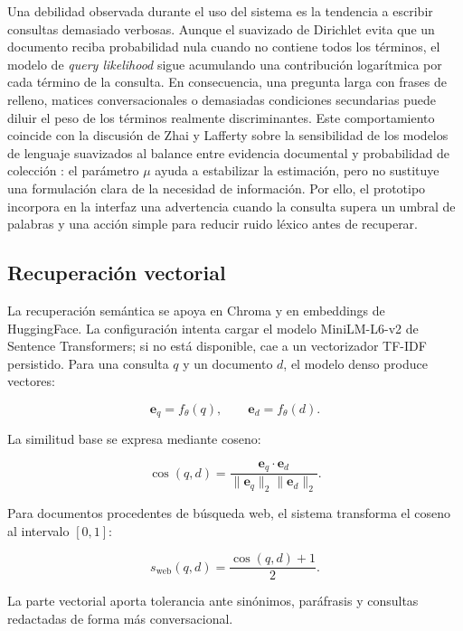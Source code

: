 \documentclass[a4paper]{llncs}
\begin{document}
Una debilidad observada durante el uso del sistema es la tendencia a escribir consultas demasiado verbosas. Aunque el suavizado de Dirichlet evita que un documento reciba probabilidad nula cuando no contiene todos los términos, el modelo de \textit{query likelihood} sigue acumulando una contribución logarítmica por cada término de la consulta. En consecuencia, una pregunta larga con frases de relleno, matices conversacionales o demasiadas condiciones secundarias puede diluir el peso de los términos realmente discriminantes. Este comportamiento coincide con la discusión de Zhai y Lafferty sobre la sensibilidad de los modelos de lenguaje suavizados al balance entre evidencia documental y probabilidad de colección \cite{zhai2001study}: el parámetro $\mu$ ayuda a estabilizar la estimación, pero no sustituye una formulación clara de la necesidad de información. Por ello, el prototipo incorpora en la interfaz una advertencia cuando la consulta supera un umbral de palabras y una acción simple para reducir ruido léxico antes de recuperar.

\subsection{Recuperación vectorial}

La recuperación semántica se apoya en Chroma y en embeddings de HuggingFace. La configuración intenta cargar el modelo MiniLM-L6-v2 de Sentence Transformers; si no está disponible, cae a un vectorizador TF-IDF persistido. Para una consulta $q$ y un documento $d$, el modelo denso produce vectores:

\begin{equation}
\mathbf{e}_q=f_{\theta}(q),\qquad \mathbf{e}_d=f_{\theta}(d).
\end{equation}

La similitud base se expresa mediante coseno:

\begin{equation}
\operatorname{cos}(q,d)=
\frac{\mathbf{e}_q\cdot \mathbf{e}_d}
{\|\mathbf{e}_q\|_2\|\mathbf{e}_d\|_2}.
\end{equation}

Para documentos procedentes de búsqueda web, el sistema transforma el coseno al intervalo $[0,1]$:

\begin{equation}
s_{\mathrm{web}}(q,d)=\frac{\operatorname{cos}(q,d)+1}{2}.
\end{equation}

La parte vectorial aporta tolerancia ante sinónimos, paráfrasis y consultas redactadas de forma más conversacional.
\end{document}
